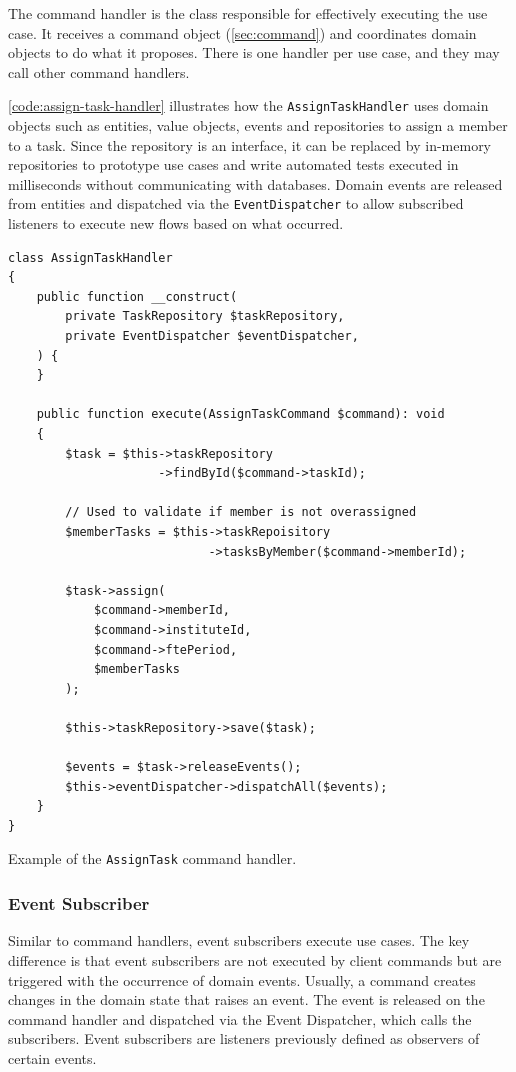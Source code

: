 The command handler is the class responsible for effectively executing the use case. It receives a command object (\autoref{sec:command}) and coordinates domain objects to do what it proposes. There is one handler per use case, and they may call other command handlers.

\autoref{code:assign-task-handler} illustrates how the \texttt{AssignTaskHandler} uses domain objects such as entities, value objects, events and repositories to assign a member to a task. Since the repository is an interface, it can be replaced by in-memory repositories to prototype use cases and write automated tests executed in milliseconds without communicating with databases. Domain events are released from entities and dispatched via the \texttt{EventDispatcher} to allow subscribed listeners to execute new flows based on what occurred.

\begin{listing}[htbp]
\begin{verbatim}
class AssignTaskHandler
{
	public function __construct(
		private TaskRepository $taskRepository,
		private EventDispatcher $eventDispatcher,
	) {
	}

	public function execute(AssignTaskCommand $command): void
	{
		$task = $this->taskRepository
                     ->findById($command->taskId);

		// Used to validate if member is not overassigned
		$memberTasks = $this->taskRepoisitory
                            ->tasksByMember($command->memberId);

		$task->assign(
			$command->memberId,
			$command->instituteId,
			$command->ftePeriod,
			$memberTasks
		);

		$this->taskRepository->save($task);

		$events = $task->releaseEvents();
		$this->eventDispatcher->dispatchAll($events);
	}
}
\end{verbatim}
\caption{Example of the \texttt{AssignTask} command handler.}
\label{code:assign-task-handler}
\end{listing}

\subsubsection{Event Subscriber}
\label{sec:event-subscriber}

Similar to command handlers, event subscribers execute use cases. The key difference is that event subscribers are not executed by client commands but are triggered with the occurrence of domain events. Usually, a command creates changes in the domain state that raises an event. The event is released on the command handler and dispatched via the Event Dispatcher, which calls the subscribers. Event subscribers are listeners previously defined as observers of certain events.

